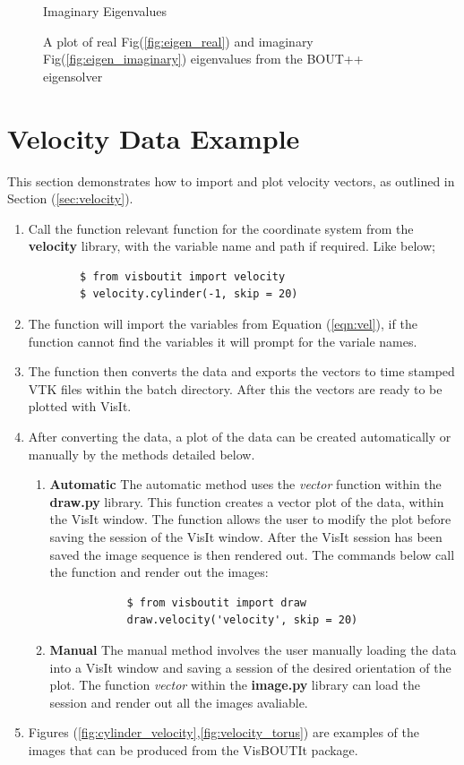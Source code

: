 \documentclass[12pt,a4paper]{article}
\begin{document}
\begin{figure}[H]
\begin{minipage}[H]{0.75\textwidth}
		\caption{Imaginary Eigenvalues}
		\label{fig:eigen_imaginary}
	\end{minipage}
	\caption{A plot of real Fig(\ref{fig:eigen_real}) and imaginary Fig(\ref{fig:eigen_imaginary}) eigenvalues from the BOUT++ eigensolver}
	\label{fig:eigen_graphs}
\end{figure}

\section{Velocity Data Example}
\label{example:velocity}
This section demonstrates how to import and plot velocity vectors, as outlined in Section (\ref{sec:velocity}).

\begin{enumerate}
	\item{Call the function relevant function for the coordinate system from the \textbf{velocity} library, with the variable name and path if required. Like below;
		\begin{verbatim}
		$ from visboutit import velocity
		$ velocity.cylinder(-1, skip = 20)
		\end{verbatim}}
	\item{The function will import the variables from Equation (\ref{eqn:vel}), if the function cannot find the variables it will prompt for the variale names.}
	\item{The function then converts the data and exports the vectors to time stamped VTK files within the batch directory. After this the vectors are ready to be plotted with VisIt.}
	\item{After converting the data, a plot of the data can be created automatically or manually by the methods detailed below.}
	\begin{enumerate}
		\item{\textbf{Automatic} The automatic method uses the  \textit{vector} function within the \textbf{draw.py} library. This function creates a vector plot of the data, within the VisIt window. The function allows the user to modify the plot before saving the session of the VisIt window. After the VisIt session has been saved the image sequence is then rendered out. The commands below call the function and render out the images:
			\begin{verbatim}
			$ from visboutit import draw
			draw.velocity('velocity', skip = 20)
			\end{verbatim}}
		
		\item{\textbf{Manual} The manual method involves the user manually loading the data into a VisIt window and saving a session of the desired orientation of the plot. The function \textit{vector} within the \textbf{image.py} library can load the session and render out all the images avaliable.}
		
	\end{enumerate}
	\item{Figures (\ref{fig:cylinder_velocity},\ref{fig:velocity_torus}) are examples of the images that can be produced from the VisBOUTIt package.}
\end{enumerate}
\end{document}
